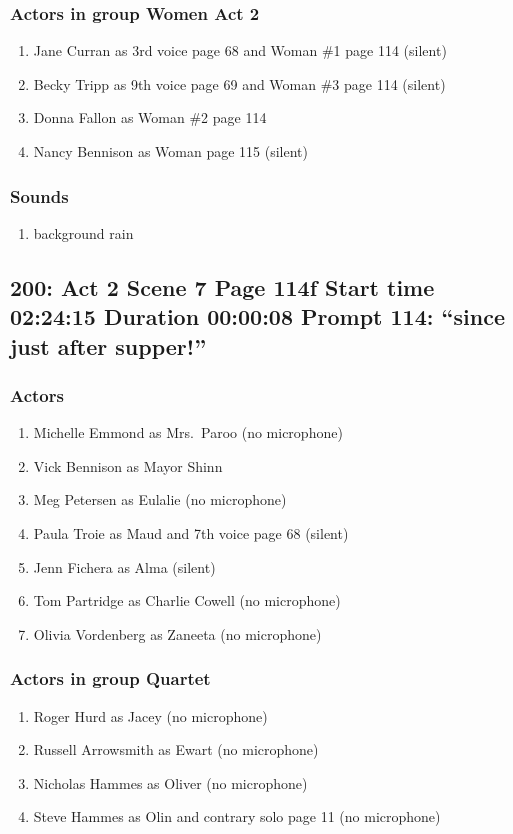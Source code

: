 \subsubsection{Actors in group Women Act 2}
\begin{enumerate}
\item Jane Curran as 3rd voice page 68 and Woman \#1 page 114 (silent)
\item Becky Tripp as 9th voice page 69 and Woman \#3 page 114 (silent)
\item Donna Fallon as Woman \#2 page 114
\item Nancy Bennison as Woman page 115 (silent)
\end{enumerate}

\subsubsection{Sounds}
\begin{enumerate}
\item background rain
\end{enumerate}
\subsection{200: Act 2 Scene 7 Page 114f Start time 02:24:15 Duration 00:00:08 Prompt 114: ``since just after supper!''}

\subsubsection{Actors}
\begin{enumerate}
\item Michelle Emmond as Mrs.~Paroo (no microphone)
\item Vick Bennison as Mayor Shinn
\item Meg Petersen as Eulalie (no microphone)
\item Paula Troie as Maud and 7th voice page 68 (silent)
\item Jenn Fichera as Alma (silent)
\item Tom Partridge as Charlie Cowell (no microphone)
\item Olivia Vordenberg as Zaneeta (no microphone)
\end{enumerate}
\subsubsection{Actors in group Quartet}
\begin{enumerate}
\item Roger Hurd as Jacey (no microphone)
\item Russell Arrowsmith as Ewart (no microphone)
\item Nicholas Hammes as Oliver (no microphone)
\item Steve Hammes as Olin and contrary solo page 11 (no microphone)
\end{enumerate}
